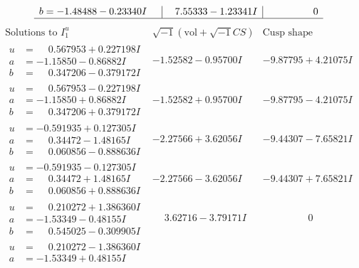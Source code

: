 \documentclass[1p]{elsarticle_modified}
\theoremstyle{definition}
\newcommand{\I}{\sqrt{-1}}
\begin{document}
$$\begin{array}{c|c|c}
\begin{aligned}
b &= -1.48488 - 0.23340 I\end{aligned}
 & \phantom{-}7.55333 - 1.23341 I & \phantom{-0.000000 } 0\\
 \hline 
 \end{array}$$\newpage$$\begin{array}{c|c|c}  
\text{Solutions to }I^u_{1}& \I (\text{vol} + \sqrt{-1}CS) & \text{Cusp shape}\\
 \hline 
\begin{aligned}
u &= \phantom{-}0.567953 + 0.227198 I \\
a &= -1.15850 - 0.86882 I \\
b &= \phantom{-}0.347206 - 0.379172 I\end{aligned}
 & -1.52582 - 0.95700 I & -9.87795 + 4.21075 I \\ \hline\begin{aligned}
u &= \phantom{-}0.567953 - 0.227198 I \\
a &= -1.15850 + 0.86882 I \\
b &= \phantom{-}0.347206 + 0.379172 I\end{aligned}
 & -1.52582 + 0.95700 I & -9.87795 - 4.21075 I \\ \hline\begin{aligned}
u &= -0.591935 + 0.127305 I \\
a &= \phantom{-}0.34472 - 1.48165 I \\
b &= \phantom{-}0.060856 - 0.888636 I\end{aligned}
 & -2.27566 + 3.62056 I & -9.44307 - 7.65821 I \\ \hline\begin{aligned}
u &= -0.591935 - 0.127305 I \\
a &= \phantom{-}0.34472 + 1.48165 I \\
b &= \phantom{-}0.060856 + 0.888636 I\end{aligned}
 & -2.27566 - 3.62056 I & -9.44307 + 7.65821 I \\ \hline\begin{aligned}
u &= \phantom{-}0.210272 + 1.386360 I \\
a &= -1.53349 - 0.48155 I \\
b &= \phantom{-}0.545025 - 0.309905 I\end{aligned}
 & \phantom{-}3.62716 - 3.79171 I & \phantom{-0.000000 } 0 \\ \hline\begin{aligned}
u &= \phantom{-}0.210272 - 1.386360 I \\
a &= -1.53349 + 0.48155 I \\

\end{aligned}
\end{array}$$
\end{document}
